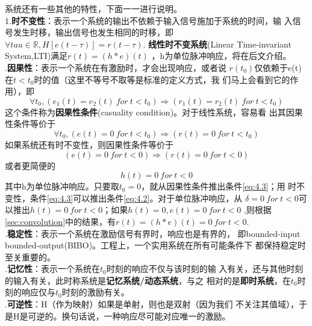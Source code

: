 \documentclass{ctexbook}
\begin{document}
系统还有一些其他的特性，下面一一进行说明。\\
1.\textbf{时不变性}：表示一个系统的输出不依赖于输入信号施加于系统的时间，输
入信号发生时移，输出信号也发生相同的时移，即$\forall tau\in\mathbb{R},H[e(t-\tau)]=r(t-\tau)$.
\textbf{线性时不变系统}(Linear Time-invariant System,LTI)满足$r(t)=(h*e)(t)$
，h为单位脉冲响应，将在后文介绍。
\\
.\textbf{因果性}：表示一个系统在有激励时，才会出现响应，或者说
$r(t_0)$仅依赖于e(t)在$t<t_0$时的值（这里不等号不取等是标准的定义方式，我
们马上会看到它的作用），即
\begin{equation}
    \forall t_0,(e_1(t)=e_2(t)\ for\ t<t_0)\Rightarrow (r_1(t)=r_2(t)\ for\ t<t_0)\label{eq:4.1}
\end{equation}
这个条件称为\textbf{因果性条件}(casuality condition)。对于线性系统，容易看
出其因果性条件等价于
\begin{equation}
    \forall t_0,(e(t)=0\ for\ t<t_0)\Rightarrow (r(t)=0\ for\ t<t_0)\label{eq:4.2}
\end{equation}
如果系统还有时不变性，则因果性条件等价于
\begin{equation}
    (e(t)=0\ for\ t<0)\Rightarrow(r(t)=0\ for\ t<0)\label{eq:4.3}
\end{equation}
或者更简便的
\begin{equation}
    h(t)=0\ for\ t<0\label{eq:4.4}
\end{equation}
其中h为单位脉冲响应。只要取$t_0=0$，就从因果性条件推出条件\ref{eq:4.3}；用
时不变性，条件\ref{eq:4.3}可以推出条件\ref{eq:4.2}。对于单位脉冲响应，从
$\delta=0\ for\ t<0$可以推出$h(t)=0\ for\ t<0$；如果$h(t)=0,e(t)=0\ for\ t<0$
,则根据\ref{sec:convolution}中的结果，有$r(t)=(h*e)(t)=0\ for\ t<0$.\\

.\textbf{稳定性}：表示一个系统在激励信号有界时，响应也是有界的，
即bounded-input bounded-output(BIBO)。工程上，一个实用系统在所有可能条件下
都保持稳定时至关重要的。\\

.\textbf{记忆性}：表示一个系统在$t_0$时刻的响应不仅与该时刻的输
入有关，还与其他时刻的输入有关，此时称系统是\textbf{记忆系统/动态系统}，与之
相对的是\textbf{即时系统}，在$t_0$时刻的响应仅与$t_0$时刻的激励有关。\\

.\textbf{可逆性}：H（作为映射）如果是单射，则也是双射（因为我们
不关注其值域），于是H是可逆的。换句话说，一种响应尽可能对应唯一的激励。

\end{document}
